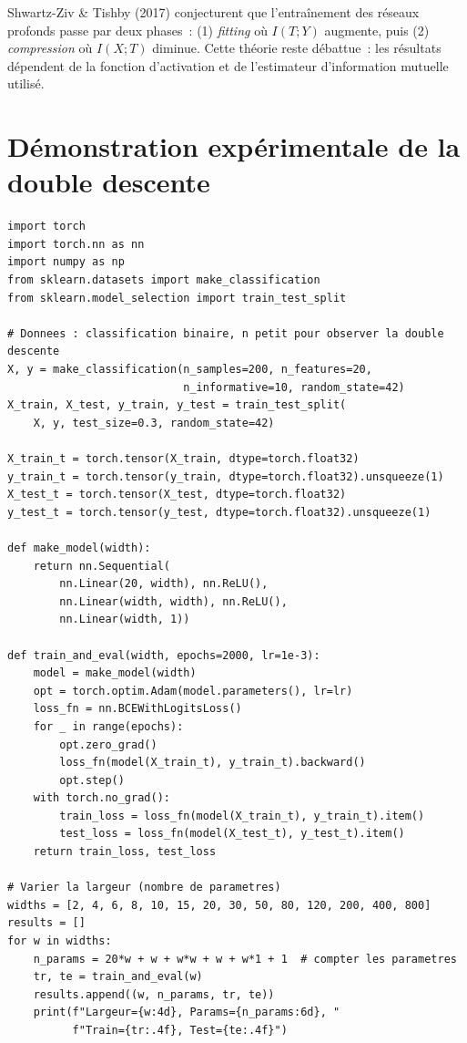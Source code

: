 \begin{remarque}
Shwartz-Ziv \& Tishby (2017) conjecturent que l'entra\^inement des r\'eseaux
profonds passe par deux phases~: (1) \emph{fitting} o\`u $I(T;Y)$ augmente,
puis (2) \emph{compression} o\`u $I(X;T)$ diminue. Cette th\'eorie reste
d\'ebattue~: les r\'esultats d\'ependent de la fonction d'activation et
de l'estimateur d'information mutuelle utilis\'e.
\end{remarque}

\section{D\'emonstration exp\'erimentale de la double descente}
\label{sec:double-descent-exp}

\begin{codeblock}[title=\textbf{Double descente exp\'erimentale avec des r\'eseaux de largeur variable}]
\begin{verbatim}
import torch
import torch.nn as nn
import numpy as np
from sklearn.datasets import make_classification
from sklearn.model_selection import train_test_split

# Donnees : classification binaire, n petit pour observer la double descente
X, y = make_classification(n_samples=200, n_features=20,
                           n_informative=10, random_state=42)
X_train, X_test, y_train, y_test = train_test_split(
    X, y, test_size=0.3, random_state=42)

X_train_t = torch.tensor(X_train, dtype=torch.float32)
y_train_t = torch.tensor(y_train, dtype=torch.float32).unsqueeze(1)
X_test_t = torch.tensor(X_test, dtype=torch.float32)
y_test_t = torch.tensor(y_test, dtype=torch.float32).unsqueeze(1)

def make_model(width):
    return nn.Sequential(
        nn.Linear(20, width), nn.ReLU(),
        nn.Linear(width, width), nn.ReLU(),
        nn.Linear(width, 1))

def train_and_eval(width, epochs=2000, lr=1e-3):
    model = make_model(width)
    opt = torch.optim.Adam(model.parameters(), lr=lr)
    loss_fn = nn.BCEWithLogitsLoss()
    for _ in range(epochs):
        opt.zero_grad()
        loss_fn(model(X_train_t), y_train_t).backward()
        opt.step()
    with torch.no_grad():
        train_loss = loss_fn(model(X_train_t), y_train_t).item()
        test_loss = loss_fn(model(X_test_t), y_test_t).item()
    return train_loss, test_loss

# Varier la largeur (nombre de parametres)
widths = [2, 4, 6, 8, 10, 15, 20, 30, 50, 80, 120, 200, 400, 800]
results = []
for w in widths:
    n_params = 20*w + w + w*w + w + w*1 + 1  # compter les parametres
    tr, te = train_and_eval(w)
    results.append((w, n_params, tr, te))
    print(f"Largeur={w:4d}, Params={n_params:6d}, "
          f"Train={tr:.4f}, Test={te:.4f}")
\end{verbatim}
\end{codeblock}

